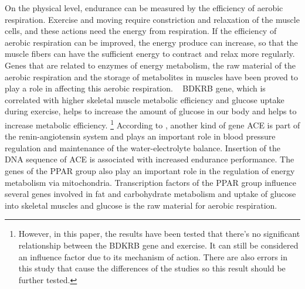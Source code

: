 \documentclass{article}
\begin{document}
On the physical level, endurance can be measured by the efficiency of aerobic respiration. \autocite{forsmanh.KoripalloilijanFyysinenHarjoittelu} Exercise and moving require constriction and relaxation of the muscle cells, and these actions need the energy from respiration. If the efficiency of aerobic respiration can be improved, the energy produce can increase, so that the muscle fibers can have the sufficient energy to contract and relax more regularly. Genes that are related to enzymes of energy metabolism, the raw material of the aerobic respiration and the storage of metabolites in muscles have been proved to play a role in affecting this aerobic respiration. \autocite{ahmetovGenesAthleticPerformance2016}  BDKRB gene, which is correlated with higher skeletal muscle metabolic efficiency and glucose uptake during exercise, helps to increase the amount of glucose in our body and helps to increase metabolic efficiency.\autocite{sawczukPolymorphismBradykininReceptor2013} \footnote{However, in this paper, the results have been tested that there’s no significant relationship between the BDKRB gene and exercise. It can still be considered an influence factor due to its mechanism of action. There are also errors  in this study that cause the differences of the studies so this result should be further tested.} According to \textcite{loefflerBiochemieUndPathobiochemie2019}, another kind of gene ACE is part of the renin-angiotensin system and plays an important role in blood pressure regulation and maintenance of the water-electrolyte balance. Insertion of the DNA sequence of ACE is associated with increased endurance performance. The genes of the PPAR group also play an important role in the regulation of energy metabolism via mitochondria. Transcription factors of the PPAR group influence several genes involved in fat and carbohydrate metabolism and uptake of glucose into skeletal muscles and glucose is the raw material for aerobic respiration.

\printbibliography{}
\end{document}
